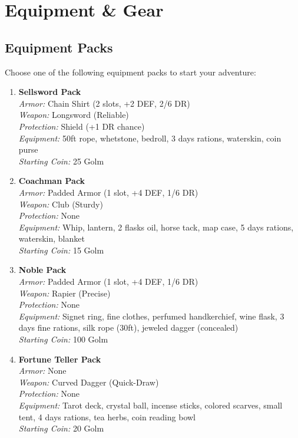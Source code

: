 \documentclass[10pt,twoside]{article}
\begin{document}
\section{Equipment \& Gear}

\subsection{Equipment Packs}
Choose one of the following equipment packs to start your adventure:

\begin{multicols}{2}
\begin{enumerate}
    \item \textcolor{packcolor}{\textbf{Sellsword Pack}} \\
    \textit{Armor:} Chain Shirt (2 slots, +2 DEF, 2/6 DR) \\
    \textit{Weapon:} Longsword (Reliable) \\
    \textit{Protection:} Shield (+1 DR chance) \\
    \textit{Equipment:} 50ft rope, whetstone, bedroll, 3 days rations, waterskin, coin purse \\
    \textit{Starting Coin:} 25 Golm
    
    \item \textcolor{packcolor}{\textbf{Coachman Pack}} \\
    \textit{Armor:} Padded Armor (1 slot, +4 DEF, 1/6 DR) \\
    \textit{Weapon:} Club (Sturdy) \\
    \textit{Protection:} None \\
    \textit{Equipment:} Whip, lantern, 2 flasks oil, horse tack, map case, 5 days rations, waterskin, blanket \\
    \textit{Starting Coin:} 15 Golm
    
    \item \textcolor{packcolor}{\textbf{Noble Pack}} \\
    \textit{Armor:} Padded Armor (1 slot, +4 DEF, 1/6 DR) \\
    \textit{Weapon:} Rapier (Precise) \\
    \textit{Protection:} None \\
    \textit{Equipment:} Signet ring, fine clothes, perfumed handkerchief, wine flask, 3 days fine rations, silk rope (30ft), jeweled dagger (concealed) \\
    \textit{Starting Coin:} 100 Golm
    
    \item \textcolor{packcolor}{\textbf{Fortune Teller Pack}} \\
    \textit{Armor:} None \\
    \textit{Weapon:} Curved Dagger (Quick-Draw) \\
    \textit{Protection:} None \\
    \textit{Equipment:} Tarot deck, crystal ball, incense sticks, colored scarves, small tent, 4 days rations, tea herbs, coin reading bowl \\
    \textit{Starting Coin:} 20 Golm
    

\end{enumerate}
\end{multicols}
\end{document}
